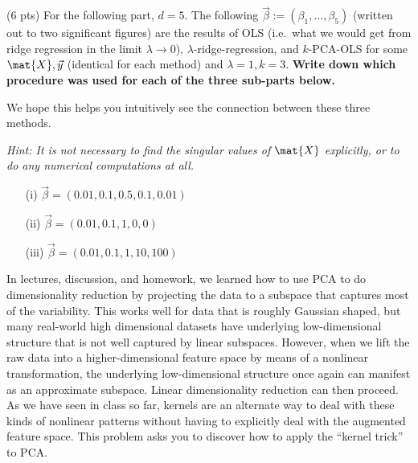 \documentclass[preview]{standalone}
\begin{document}
\begin{Parts}
\newpage




\newpage
\Part (6 pts) For the following part, $d=5$. The following
$\vec{\beta}:=(\beta_1,\ldots,\beta_{5})$  (written out to two
significant figures) are the results of OLS (i.e.~what we would get
from ridge regression in the limit $\lambda \rightarrow 0$), $\lambda$-ridge-regression, and
$k$-PCA-OLS for some $\mat{X},\vec{y}$ (identical for each method) and $\lambda=1,
k=3$. {\bf Write down which procedure was used for each of the
 three sub-parts below.}

We hope this helps you intuitively see the connection between these
three methods.

{\em Hint: It is not necessary to find the singular values of
  $\mat{X}$ explicitly, or to do any numerical computations at all.}

\begin{itemize}
\item[(i)]  $\vec{\beta} = (0.01, 0.1, 0.5, 0.1, 0.01)$

\vspace{1in}

\item[(ii)] $\vec{\beta} =  (0.01, 0.1, 1, 0, 0)$

\vspace{1in}

\item[(iii)] $\vec{\beta} =  (0.01, 0.1, 1, 10, 100)$
\vspace{1in}

\end{itemize}





\end{Parts}


In lectures, discussion, and homework, we learned how to use PCA to do
dimensionality reduction by projecting the data to a subspace that
captures most of the variability. This works well for data that is
roughly Gaussian shaped, but many real-world high dimensional datasets
have underlying low-dimensional structure that is not well captured by
linear subspaces. However, when we lift the raw data into a
higher-dimensional feature space by means of a nonlinear
transformation, the underlying low-dimensional structure once again
can manifest as an approximate subspace. Linear dimensionality reduction can then
proceed. As we have seen in class so far, kernels are an alternate way
to deal with these kinds of nonlinear patterns without having to
explicitly deal with the augmented feature space. This problem asks
you to discover how to apply the ``kernel trick'' to PCA.
\end{document}
